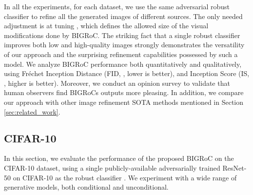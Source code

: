 \documentclass[10pt]{article} \usepackage[accepted]{tmlr}
\begin{document}
In all the experiments, for each dataset, we use the same adversarial robust classifier to refine all the generated images of different sources.
The only needed adjustment is at tuning , which defines the allowed size of the visual modifications done by BIGRoC.
The striking fact that a single robust classifier improves both low and high-quality images strongly demonstrates the versatility of our approach and the surprising refinement capabilities possessed by such a model.
We analyze BIGRoC performance both quantitatively and qualitatively, using Fréchet Inception Distance (FID, \citep{heusel2018gans}, lower is better), and Inception Score (IS, \citep{salimans2016improved}, higher is better). Moreover, we conduct an opinion survey to validate that human observers find BIGRoCs outputs more pleasing.
In addition, we compare our approach with other image refinement SOTA methods mentioned in Section \ref{sec:related_work}.

\subsection{CIFAR-10}

In this section, we evaluate the performance of the proposed BIGRoC on the CIFAR-10 dataset, using a single publicly-available adversarially trained ResNet-50 on CIFAR-10 as the robust classifier \citep{robustness}. We experiment with a wide range of generative models, both conditional and unconditional.
\end{document}
